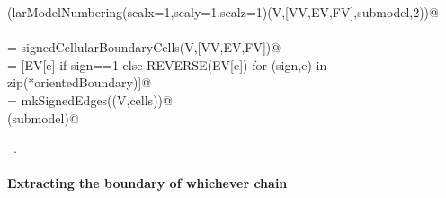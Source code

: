 \documentclass[11pt,oneside]{article}	%
\begin{document}
\begin{flushleft}
\begin{list}{}{}
\mbox{}\verb@VIEW(larModelNumbering(scalx=1,scaly=1,scalz=1)(V,[VV,EV,FV],submodel,2))@\\
\mbox{}\verb@@\\
\mbox{}\verb@orientedBoundary = signedCellularBoundaryCells(V,[VV,EV,FV])@\\
\mbox{}\verb@cells = [EV[e] if sign==1 else REVERSE(EV[e]) for (sign,e) in zip(*orientedBoundary)]@\\
\mbox{}\verb@submodel = mkSignedEdges((V,cells))@\\
\mbox{}\verb@VIEW(submodel)@\\
\mbox{}\verb@@{\NWsep}
\end{list}
\vspace{-1ex}
\footnotesize\addtolength{\baselineskip}{-1ex}
\begin{list}{}{\setlength{\itemsep}{-\parsep}\setlength{\itemindent}{-\leftmargin}}
\item \NWtxtMacroRefIn\ .
\end{list}
\end{flushleft}


\paragraph{Extracting the boundary of whichever chain}
\end{document}
